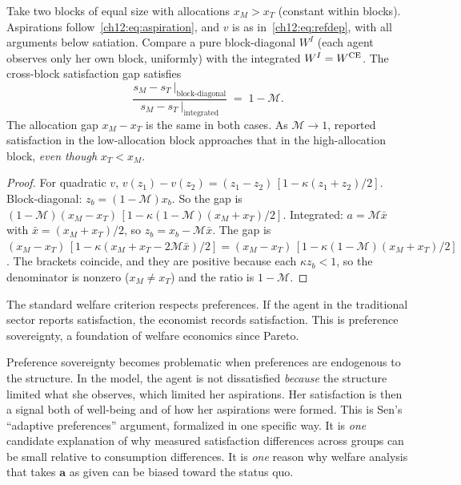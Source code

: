 \documentclass[../structural_economics_book.tex]{subfiles}
\begin{document}
\begin{proposition}\label{ch12:thm:paradox}
Take two blocks of equal size with allocations $x_M > x_T$ (constant within blocks). Aspirations follow~\eqref{ch12:eq:aspiration}, and $v$ is as in~\eqref{ch12:eq:refdep}, with all arguments below satiation. Compare a pure block-diagonal $W^I$ (each agent observes only her own block, uniformly) with the integrated $W^I = W^{\text{CE}}$. The cross-block satisfaction gap satisfies
\begin{equation}\label{ch12:eq:paradox}
\frac{s_M - s_T\ \big|_{\text{block-diagonal}}}{s_M - s_T\ \big|_{\text{integrated}}} \;=\; 1 - \mathcal{M}.
\end{equation}
The allocation gap $x_M - x_T$ is the same in both cases. As $\mathcal{M} \to 1$, reported satisfaction in the low-allocation block approaches that in the high-allocation block, \textit{even though} $x_T < x_M$.
\end{proposition}

\begin{proof}
For quadratic $v$, $v(z_1) - v(z_2) = (z_1 - z_2)\,[1 - \kappa(z_1 + z_2)/2]$. Block-diagonal: $z_b = (1 - \mathcal{M})x_b$. So the gap is $(1-\mathcal{M})(x_M - x_T)\,[1 - \kappa(1 - \mathcal{M})(x_M + x_T)/2]$. Integrated: $a = \mathcal{M}\bar{x}$ with $\bar{x} = (x_M + x_T)/2$, so $z_b = x_b - \mathcal{M}\bar{x}$. The gap is $(x_M - x_T)\,[1 - \kappa(x_M + x_T - 2\mathcal{M}\bar{x})/2] = (x_M - x_T)\,[1 - \kappa(1 - \mathcal{M})(x_M + x_T)/2]$. The brackets coincide, and they are positive because each $\kappa z_b < 1$, so the denominator is nonzero ($x_M \neq x_T$) and the ratio is $1 - \mathcal{M}$.
\end{proof}

\begin{intuition}
The standard welfare criterion respects preferences. If the agent in the traditional sector reports satisfaction, the economist records satisfaction. This is preference sovereignty, a foundation of welfare economics since Pareto.

Preference sovereignty becomes problematic when preferences are endogenous to the structure. In the model, the agent is not dissatisfied \textit{because} the structure limited what she observes, which limited her aspirations. Her satisfaction is then a signal both of well-being and of how her aspirations were formed. This is Sen's ``adaptive preferences'' argument, formalized in one specific way. It is \textit{one} candidate explanation of why measured satisfaction differences across groups can be small relative to consumption differences. It is \textit{one} reason why welfare analysis that takes $\mathbf{a}$ as given can be biased toward the status quo.
\end{intuition}
\end{document}
